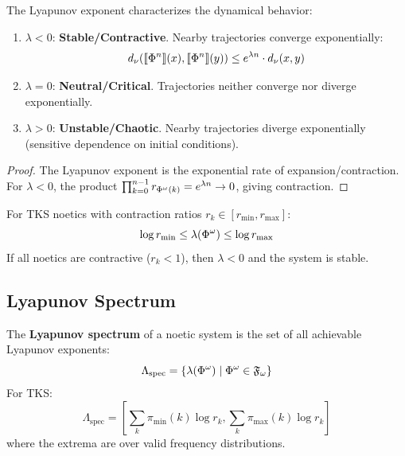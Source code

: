 \begin{theorem}
\label{thm:lyapunov-interpretation}
The Lyapunov exponent characterizes the dynamical behavior:
\begin{enumerate}[label=(\roman*)]
  \item $\lambda < 0$: \textbf{Stable/Contractive}. Nearby trajectories converge exponentially:
  \[
  d_\nu(\llbracket \Phi^{n} \rrbracket(x), \llbracket \Phi^{n} \rrbracket(y)) \leq e^{\lambda n} \cdot d_\nu(x, y)
  \]

  \item $\lambda = 0$: \textbf{Neutral/Critical}. Trajectories neither converge nor diverge exponentially.

  \item $\lambda > 0$: \textbf{Unstable/Chaotic}. Nearby trajectories diverge exponentially (sensitive dependence on initial conditions).
\end{enumerate}
\end{theorem}

\begin{proof}
The Lyapunov exponent is the exponential rate of expansion/contraction. For $\lambda < 0$, the product $\prod_{k=0}^{n-1} r_{\Phi^{\omega}(k)} = e^{\lambda n} \to 0$, giving contraction.
\end{proof}

\begin{corollary}
\label{cor:tks-lyapunov-bounds}
For TKS noetics with contraction ratios $r_k \in [r_{\min}, r_{\max}]$:
\[
\log r_{\min} \leq \lambda(\Phi^{\omega}) \leq \log r_{\max}
\]
If all noetics are contractive ($r_k < 1$), then $\lambda < 0$ and the system is stable.
\end{corollary}

\subsection{Lyapunov Spectrum}

\begin{definition}
\label{def:lyapunov-spectrum}
The \textbf{Lyapunov spectrum} of a noetic system is the set of all achievable Lyapunov exponents:
\[
\Lambda_{\mathrm{spec}} = \{\lambda(\Phi^{\omega}) \mid \Phi^{\omega} \in \mathfrak{F}_\omega\}
\]
For TKS:
\[
\Lambda_{\mathrm{spec}} = \left[\sum_k \pi_{\min}(k) \log r_k, \sum_k \pi_{\max}(k) \log r_k\right]
\]
where the extrema are over valid frequency distributions.
\end{definition}

